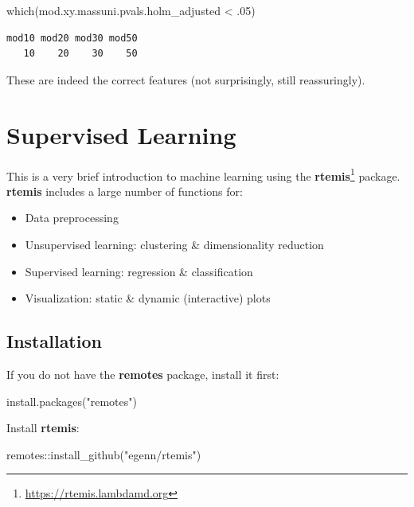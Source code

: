 \documentclass[
]{book}
\newenvironment{Shaded}{\begin{snugshade}}{\end{snugshade}}
\newcommand{\DecValTok}[1]{\textcolor[rgb]{0.00,0.00,0.81}{#1}}
\newcommand{\FunctionTok}[1]{\textcolor[rgb]{0.00,0.00,0.00}{#1}}
\newcommand{\NormalTok}[1]{#1}
\newcommand{\SpecialCharTok}[1]{\textcolor[rgb]{0.00,0.00,0.00}{#1}}
\newcommand{\StringTok}[1]{\textcolor[rgb]{0.31,0.60,0.02}{#1}}
\providecommand{\tightlist}{%
  \setlength{\itemsep}{0pt}\setlength{\parskip}{0pt}}
\renewcommand{\href}[2]{#2\footnote{\url{#1}}}
\begin{document}
\begin{Shaded}
\begin{Highlighting}[]
\FunctionTok{which}\NormalTok{(mod.xy.massuni.pvals.holm\_adjusted }\SpecialCharTok{\textless{}}\NormalTok{ .}\DecValTok{05}\NormalTok{)}
\end{Highlighting}
\end{Shaded}

\begin{verbatim}
mod10 mod20 mod30 mod50 
   10    20    30    50 
\end{verbatim}

These are indeed the correct features (not surprisingly, still reassuringly).

\hypertarget{supervised}{%
\chapter{Supervised Learning}\label{supervised}}

This is a very brief introduction to machine learning using the \href{https://rtemis.lambdamd.org}{\textbf{rtemis}} package. \textbf{rtemis} includes a large number of functions for:

\begin{itemize}
\tightlist
\item
  Data preprocessing
\item
  Unsupervised learning: clustering \& dimensionality reduction
\item
  Supervised learning: regression \& classification
\item
  Visualization: static \& dynamic (interactive) plots
\end{itemize}

\hypertarget{installation}{%
\section{Installation}\label{installation}}

If you do not have the \textbf{remotes} package, install it first:

\begin{Shaded}
\begin{Highlighting}[]
\FunctionTok{install.packages}\NormalTok{(}\StringTok{"remotes"}\NormalTok{)}
\end{Highlighting}
\end{Shaded}

Install \textbf{rtemis}:

\begin{Shaded}
\begin{Highlighting}[]
\NormalTok{remotes}\SpecialCharTok{::}\FunctionTok{install\_github}\NormalTok{(}\StringTok{"egenn/rtemis"}\NormalTok{)}
\end{Highlighting}
\end{Shaded}
\end{document}
